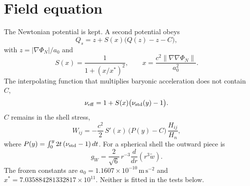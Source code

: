 \begin{abstract}
A tidal screen adds one constant, \(C\), to a two-field Newtonian theory. The constant drops out of the rotation-curve law and remains in the shell stress. At \(C=0\) the shell pushes new comets below the observed Oort peak. The value used here is the centre of the window that puts that peak back, \(C=0.579125\) at a Galactic field \(1.9\times10^{-10}\,\mathrm{m\,s^{-2}}\). At that value the Cassini quadrupole is unchanged, a clean Gaia wide-binary cut prefers the model to Newton, 171 SPARC galaxies are unchanged at the level of the fit, and four dwarfs take stellar mass-to-light ratios. The same clean cut was repeated at the two edges of the window. All three pass. A radial integration of comet orbits agrees with the energy proxy to \(1.3\times10^{-6}\,\mathrm{au^{-1}}\). The non-relativistic action that produces the field equation is written down. The constant \(C\) is not fixed by that action. A relativistic completion in which the tide invariant is dynamical, a full comet population in the sense of Vokrouhlick\'y, Nesvorn\'y and Tremaine, and a cosmological sector are not in this paper.
\end{abstract}

\section{Field equation}

The Newtonian potential is kept. A second potential obeys
\begin{equation}
Q_s = z + S(x)\bigl(Q(z)-z-C\bigr),
\label{eq:qs}
\end{equation}
with \(z=|\nabla\Phi_N|/a_0\) and
\[
S(x)=\frac{1}{1+(x/x^*)^2},\qquad
x=\frac{c^2\|\nabla\nabla\Phi_N\|}{a_0^2}.
\]
The interpolating function that multiplies baryonic acceleration does not contain \(C\),
\begin{equation}
\nu_{\rm eff}=1+S(x)\bigl(\nu_{\rm std}(y)-1\bigr).
\label{eq:nueff}
\end{equation}
\(C\) remains in the shell stress,
\begin{equation}
W_{ij}=-\frac{c^2}{2}\,S'(x)\,\bigl(P(y)-C\bigr)\,\frac{H_{ij}}{H_n},
\label{eq:W}
\end{equation}
where \(P(y)=\int_0^y 2t\,(\nu_{\rm std}-1)\,dt\). For a spherical shell the outward piece is
\[
g_W=\frac{2}{\sqrt{6}}\,r^{-3}\frac{d}{dr}(r^3\tilde w).
\]
The frozen constants are \(a_0=1.1607\times10^{-10}\,\mathrm{m\,s^{-2}}\) and \(x^*=7.035884281332817\times10^{11}\). Neither is fitted in the tests below.

